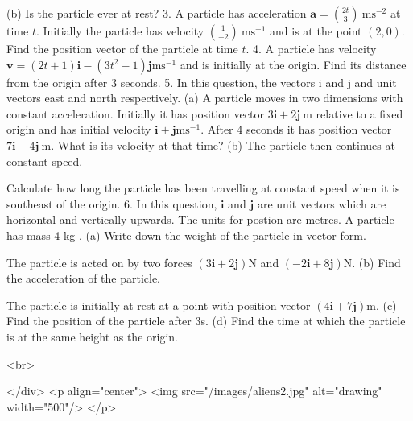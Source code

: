 (b) Is the particle ever at rest?
3. A particle has acceleration $\mathbf{a}=\binom{2 t}{3} \mathrm{~ms}^{-2}$ at time $t$. Initially the particle has velocity $\binom{1}{-2} \mathrm{~ms}^{-1}$ and is at the point $(2,0)$. Find the position vector of the particle at time $t$.
4. A particle has velocity $\mathbf{v}=(2 t+1) \mathbf{i}-\left(3 t^{2}-1\right) \mathbf{j} \mathrm{ms}^{-1}$ and is initially at the origin. Find its distance from the origin after 3 seconds.
5. In this question, the vectors i and j and unit vectors east and north respectively.
(a) A particle moves in two dimensions with constant acceleration. Initially it has position vector $3 \mathbf{i}+2 \mathbf{j} \mathrm{~m}$ relative to a fixed origin and has initial velocity $\mathbf{i}+\mathbf{j} \mathrm{ms}^{-1}$. After 4 seconds it has position vector $7 \mathbf{i}-4 \mathbf{j} \mathrm{~m}$.
What is its velocity at that time?
(b) The particle then continues at constant speed.

Calculate how long the particle has been travelling at constant speed when it is southeast of the origin.
6. In this question, $\mathbf{i}$ and $\mathbf{j}$ are unit vectors which are horizontal and vertically upwards. The units for postion are metres.
A particle has mass 4 kg .
(a) Write down the weight of the particle in vector form.

The particle is acted on by two forces $(3 \mathbf{i}+2 \mathbf{j}) \mathrm{N}$ and $(-2 \mathbf{i}+8 \mathbf{j}) \mathrm{N}$.
(b) Find the acceleration of the particle.

The particle is initially at rest at a point with position vector $(4 \mathbf{i}+7 \mathbf{j}) \mathrm{m}$.
(c) Find the position of the particle after 3s.
(d) Find the time at which the particle is at the same height as the origin.

<br>

</div>
<p align="center">
<img src="/images/aliens2.jpg" alt="drawing" width="500"/>
</p>
